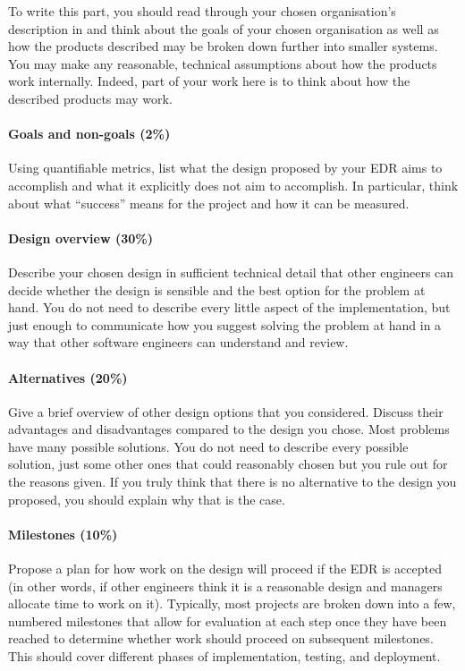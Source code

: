 To write this part, you should read through your chosen organisation's description in  and think about the goals of your chosen organisation as well as how the products described may be broken down further into smaller systems. You may make any reasonable, technical assumptions about how the products work internally. Indeed, part of your work here is to think about how the described products may work.

\paragraph{Goals and non-goals (2\%)} Using quantifiable metrics, list what the design proposed by your EDR aims to accomplish and what it explicitly does not aim to accomplish. In particular, think about what ``success'' means for the project and how it can be measured.

\paragraph{Design overview (30\%)} Describe your chosen design in sufficient technical detail that other engineers can decide whether the design is sensible and the best option for the problem at hand. You do not need to describe every little aspect of the implementation, but just enough to communicate how you suggest solving the problem at hand in a way that other software engineers can understand and review.

\paragraph{Alternatives (20\%)} Give a brief overview of other design options that you considered. Discuss their advantages and disadvantages compared to the design you chose. Most problems have many possible solutions. You do not need to describe every possible solution, just some other ones that could reasonably chosen but you rule out for the reasons given. If you truly think that there is no alternative to the design you proposed, you should explain why that is the case.

\paragraph{Milestones (10\%)} Propose a plan for how work on the design will proceed if the EDR is accepted (in other words, if other engineers think it is a reasonable design and managers allocate time to work on it). Typically, most projects are broken down into a few, numbered milestones that allow for evaluation at each step once they have been reached to determine whether work should proceed on subsequent milestones. This should cover different phases of implementation, testing, and deployment.

